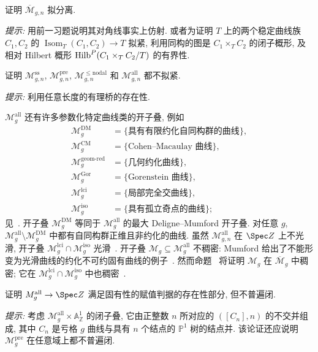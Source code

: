 \begin{exercise}\label{src:6.4.18}
证明 $\overline{\mathcal M}_{g,\allowbreak n}$ 拟分离.

\textit{提示:} 用前一习题说明其对角线事实上仿射. 或者为证明 $T$ 上的两个稳定曲线族 $C_1,\allowbreak C_2$ 的 $\operatorname{Isom}_T(C_1,\allowbreak C_2)\to\allowbreak T$ 拟紧, 利用同构的图是 $C_1\times_T C_2$ 的闭子概形, 及相对 Hilbert 概形 $\operatorname{Hilb}^P(C_1\times_T C_2/T)$ 的有界性.
\end{exercise}
\begin{exercise}\label{src:6.4.19}
证明 $\mathcal M_{g,\allowbreak n}^{\mathrm{ss}}$, $\mathcal M_{g,\allowbreak n}^{\mathrm{pre}}$, $\mathcal M_{g,\allowbreak n}^{\leq\mathrm{nodal}}$ 和 $\mathcal M_{g,\allowbreak n}^{\mathrm{all}}$ 都不拟紧.

\textit{提示:} 利用任意长度的有理桥的存在性.
\end{exercise}
\begin{remark}\label{src:6.4.20}
$\mathcal M_g^{\mathrm{all}}$ 还有许多参数化特定曲线类的开子叠, 例如
\[
\begin{aligned}
\mathcal M_g^{\mathrm{DM}}&=\{\text{具有有限约化自同构群的曲线}\},\\
\mathcal M_g^{\mathrm{CM}}&=\{\text{Cohen--Macaulay 曲线}\},\\
\mathcal M_g^{\mathrm{geom\text{-}red}}&=\{\text{几何约化曲线}\},\\
\mathcal M_g^{\mathrm{Gor}}&=\{\text{Gorenstein 曲线}\},\\
\mathcal M_g^{\mathrm{lci}}&=\{\text{局部完全交曲线}\},\\
\mathcal M_g^{\mathrm{iso}}&=\{\text{具有孤立奇点的曲线}\};
\end{aligned}
\]
见~\cite[Tags 0DST--0E0K]{SP}. 开子叠 $\mathcal M_g^{\mathrm{DM}}$ 等同于 $\mathcal M_g^{\mathrm{all}}$ 的最大 Deligne--Mumford 开子叠. 对任意 $g$, $\mathcal M_g^{\mathrm{all}}\setminus\mathcal M_g^{\mathrm{DM}}$ 中都有自同构群正维且非约化的曲线. 虽然 $\mathcal M_{g,\allowbreak n}^{\mathrm{all}}$ 在 $\Spec\mathbb Z$ 上不光滑, 开子叠 $\mathcal M_g^{\mathrm{lci}}\cap\mathcal M_g^{\mathrm{iso}}$ 光滑~\cite[Tag 0DZX]{SP}. 开子叠 $\mathcal M_g\subseteq\mathcal M_g^{\mathrm{all}}$ 不稠密: Mumford 给出了不能形变为光滑曲线的约化不可约固有曲线的例子~\cite{Mum75b}. 然而命题~ 将证明 $\mathcal M_g$ 在 $\overline{\mathcal M}_g$ 中稠密; 它在 $\mathcal M_g^{\mathrm{lci}}\cap\mathcal M_g^{\mathrm{iso}}$ 中也稠密~\cite[Tag 0E86]{SP}.
\end{remark}
\begin{exercise}[不重要]\label{src:6.4.21}
证明 $\mathcal M_g^{\mathrm{all}}\to\Spec\mathbb Z$ 满足固有性的赋值判据的存在性部分, 但不普遍闭.

\textit{提示:} 考虑 $\mathcal M_g^{\mathrm{all}}\times\mathbb A^1_{\mathbb Z}$ 的闭子叠, 它由正整数 $n$ 所对应的 $([C_n],\allowbreak n)$ 的不交并组成, 其中 $C_n$ 是亏格 $g$ 曲线与具有 $n$ 个结点的 $\mathbb P^1$ 树的结点并. 该论证还应说明 $\mathcal M_g^{\mathrm{pre}}$ 在任意域上都不普遍闭.
\end{exercise}
